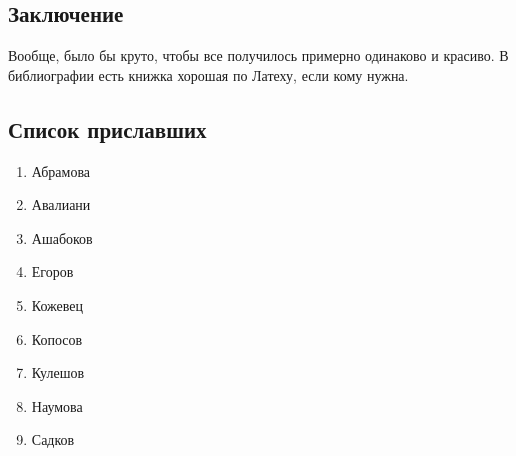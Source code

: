 \subsection{Заключение}

Вообще, было бы круто, чтобы все получилось примерно одинаково и красиво. В библиографии есть книжка хорошая по Латеху, если кому нужна.

\subsection{Список приславших} 

\begin{enumerate}
    \item Абрамова
    \item Авалиани
    \item Ашабоков
    \item Егоров
    \item Кожевец
    \item Копосов
    \item Кулешов
    \item Наумова
    \item Садков
\end{enumerate}